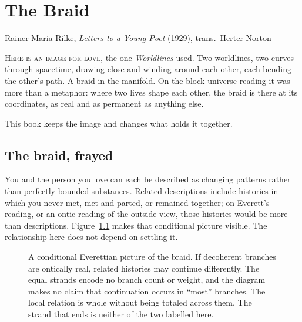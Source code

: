 \chapter{The Braid}

{Rainer Maria Rilke, \textit{Letters to a Young Poet} (1929), trans.\ Herter Norton}

\noindent \textsc{Here is an image for love}, the one \textit{Worldlines} used. Two worldlines, two curves through spacetime, drawing close and winding around each other, each bending the other's path. A braid in the manifold. On the block-universe reading it was more than a metaphor: where two lives shape each other, the braid is there at its coordinates, as real and as permanent as anything else.

This book keeps the image and changes what holds it together.

\section*{The braid, frayed}

You and the person you love can each be described as changing patterns rather than perfectly bounded substances. Related descriptions include histories in which you never met, met and parted, or remained together; on Everett's reading, or an ontic reading of the outside view, those histories would be more than descriptions. Figure~\ref{fig:braid} makes that conditional picture visible. The relationship here does not depend on settling it.

\begin{figure}[h]
\centering
{}
\caption{A conditional Everettian picture of the braid. If decoherent branches are ontically real, related histories may continue differently. The equal strands encode no branch count or weight, and the diagram makes no claim that continuation occurs in ``most'' branches. The local relation is whole without being totaled across them. The strand that ends is neither of the two labelled here.}
\label{fig:braid}
\end{figure}

